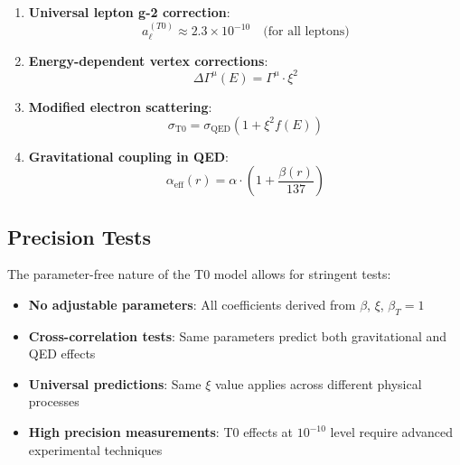 \documentclass[12pt,a4paper]{article}
\begin{document}
	\begin{enumerate}
		\item \textbf{Universal lepton g-2 correction}:
		\begin{equation}
			a_{\ell}^{(T0)} \approx 2.3 \times 10^{-10} \quad \text{(for all leptons)}
		\end{equation}
		
		\item \textbf{Energy-dependent vertex corrections}:
		\begin{equation}
			\Delta \Gamma^{\mu}(E) = \Gamma^{\mu} \cdot \xi^2
			\label{eq:energy_dependent_vertex}
		\end{equation}
		
		\item \textbf{Modified electron scattering}:
		\begin{equation}
			\sigma_{\text{T0}} = \sigma_{\text{QED}} \left(1 + \xi^2 f(E)\right)
			\label{eq:modified_scattering}
		\end{equation}
		
		\item \textbf{Gravitational coupling in QED}:
		\begin{equation}
			\alpha_{\text{eff}}(r) = \alpha \cdot \left(1 + \frac{\beta(r)}{137}\right)
			\label{eq:gravitational_coupling}
		\end{equation}
	\end{enumerate}
	
	\subsection{Precision Tests}
	\label{subsec:precision_tests}
	
	The parameter-free nature of the T0 model allows for stringent tests:
	
	\begin{itemize}
		\item \textbf{No adjustable parameters}: All coefficients derived from $\beta$, $\xi$, $\beta_T = 1$
		\item \textbf{Cross-correlation tests}: Same parameters predict both gravitational and QED effects
		\item \textbf{Universal predictions}: Same $\xi$ value applies across different physical processes
		\item \textbf{High precision measurements}: T0 effects at $10^{-10}$ level require advanced experimental techniques
	\end{itemize}
	
\end{document}
